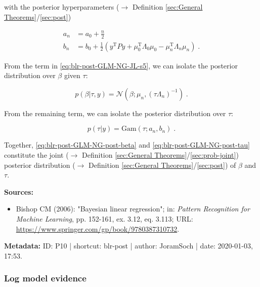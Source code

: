 \documentclass[a4paper,12pt,twoside]{book}
\begin{document}
with the posterior hyperparameters ($\rightarrow$ Definition \ref{sec:General Theorems}/\ref{sec:post})

\begin{equation} \label{eq:blr-post-GLM-NG-post-tau-par}
\begin{split}
a_n &= a_0 + \frac{n}{2} \\
b_n &= b_0 + \frac{1}{2} (y^\mathrm{T} P y + \mu_0^\mathrm{T} \Lambda_0 \mu_0 - \mu_n^\mathrm{T} \Lambda_n \mu_n) \; .
\end{split}
\end{equation}

From the term in \eqref{eq:blr-post-GLM-NG-JL-s5}, we can isolate the posterior distribution over $\beta$ given $\tau$:

\begin{equation} \label{eq:blr-post-GLM-NG-post-beta}
p(\beta|\tau,y) = \mathcal{N}(\beta; \mu_n, (\tau \Lambda_n)^{-1}) \; .
\end{equation}

From the remaining term, we can isolate the posterior distribution over $\tau$:

\begin{equation} \label{eq:blr-post-GLM-NG-post-tau}
p(\tau|y) = \mathrm{Gam}(\tau; a_n, b_n) \; .
\end{equation}

Together, \eqref{eq:blr-post-GLM-NG-post-beta} and \eqref{eq:blr-post-GLM-NG-post-tau} constitute the joint ($\rightarrow$ Definition \ref{sec:General Theorems}/\ref{sec:prob-joint}) posterior distribution ($\rightarrow$ Definition \ref{sec:General Theorems}/\ref{sec:post}) of $\beta$ and $\tau$.


\vspace{1em}
\textbf{Sources:}
\begin{itemize}
\item Bishop CM (2006): "Bayesian linear regression"; in: \textit{Pattern Recognition for Machine Learning}, pp. 152-161, ex. 3.12, eq. 3.113; URL: \url{https://www.springer.com/gp/book/9780387310732}.
\end{itemize}


\vspace{1em}
\textbf{Metadata:} ID: P10 | shortcut: blr-post | author: JoramSoch | date: 2020-01-03, 17:53.
\vspace{1em}



\subsubsection[\textbf{Log model evidence}]{Log model evidence} \label{sec:blr-lme}
\setcounter{equation}{0}
\end{document}
